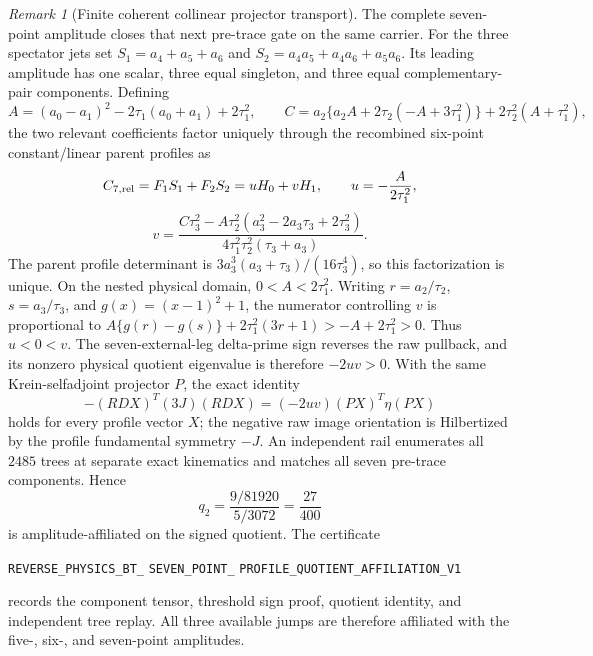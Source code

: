 \documentclass[11pt]{article}
\theoremstyle{definition}
\theoremstyle{remark}
\newtheorem{remark}[theorem]{Remark}
\begin{document}
\begin{remark}[Finite coherent collinear projector transport]
The complete seven-point amplitude closes that next pre-trace gate on the
same carrier.  For the three spectator jets set
$S_1=a_4+a_5+a_6$ and
$S_2=a_4a_5+a_4a_6+a_5a_6$.  Its leading amplitude has one scalar, three
equal singleton, and three equal complementary-pair components.  Defining
\[
 A=(a_0-a_1)^2-2\tau_1(a_0+a_1)+2\tau_1^2,
 \qquad
 C=a_2\{a_2A+2\tau_2(-A+3\tau_1^2)\}
   +2\tau_2^2(A+\tau_1^2),
\]
the two relevant coefficients factor uniquely through the recombined
six-point constant/linear parent profiles as
\[
 C_{7,{\rm rel}}=F_1S_1+F_2S_2=uH_0+vH_1,
 \qquad
 u=-\frac{A}{2\tau_1^2},
\]
\[
 v=\frac{C\tau_3^2
 -A\tau_2^2(a_3^2-2a_3\tau_3+2\tau_3^2)}
 {4\tau_1^2\tau_2^2(\tau_3+a_3)}.
\]
The parent profile determinant is
$3a_3^3(a_3+\tau_3)/(16\tau_3^4)$, so this factorization is unique.  On the
nested physical domain, $0<A<2\tau_1^2$.  Writing
$r=a_2/\tau_2$, $s=a_3/\tau_3$, and $g(x)=(x-1)^2+1$, the numerator controlling
$v$ is proportional to
$A\{g(r)-g(s)\}+2\tau_1^2(3r+1)>-A+2\tau_1^2>0$.
Thus $u<0<v$.  The seven-external-leg delta-prime sign reverses the raw
pullback, and its nonzero physical quotient eigenvalue is therefore
$-2uv>0$.  With the same Krein-selfadjoint projector $P$, the exact identity
\[
 -(RDX)^T(3J)(RDX)=(-2uv)(PX)^T\eta(PX)
\]
holds for every profile vector $X$; the negative raw image orientation is
Hilbertized by the profile fundamental symmetry $-J$.  An independent rail
enumerates all $2485$ trees at separate exact kinematics and matches all seven
pre-trace components.  Hence
\[
 q_2=\frac{9/81920}{5/3072}=\frac{27}{400}
\]
is amplitude-affiliated on the signed quotient.  The certificate
\par\noindent
\texttt{REVERSE\_PHYSICS\_BT\_}\allowbreak
\texttt{SEVEN\_POINT\_}\allowbreak
\texttt{PROFILE\_QUOTIENT\_AFFILIATION\_V1}
\par\noindent
records the component tensor, threshold sign proof, quotient identity, and
independent tree replay.  All three available jumps are therefore affiliated
with the five-, six-, and seven-point amplitudes.


\end{remark}
\end{document}
